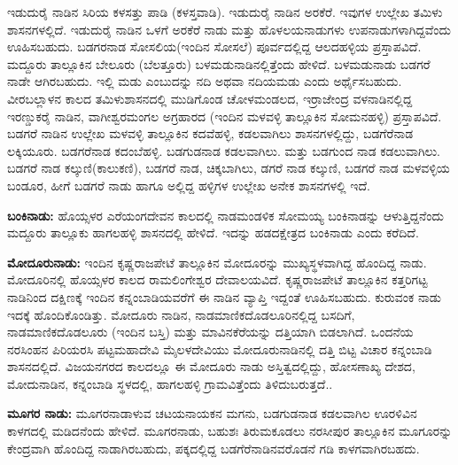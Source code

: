 ಇಡುದುರೈ ನಾಡಿನ ಸಿರಿಯ ಕಳಸತ್ತು ಪಾಡಿ (ಕಳಸ್ತವಾಡಿ). ಇಡುದುರೈ ನಾಡಿನ ಅರಕೆರೆ. ಇವುಗಳ ಉಲ್ಲೇಖ ತಮಿಳು ಶಾಸನಗಳಲ್ಲಿದೆ. ಇಡುದುರೈ ನಾಡಿನ ಒಳಗೆ ಅರಕೆರೆ ನಾಡು ಮತ್ತು ಹೊಳಲಯನಾಡುಗಳು ಉಪನಾಡುಗಳಾಗಿದ್ದವೆಂದು ಊಹಿಸಬಹುದು. ಬಡಗರನಾಡ ಸೋಸಲಿಯ(ಇಂದಿನ ಸೋಸಲೆ) ಪೂರ್ವದಲ್ಲಿದ್ದ ಆಲದಹಳ್ಳಿಯ ಪ್ರಸ್ತಾಪವಿದೆ. ಮದ್ದೂರು ತಾಲ್ಲೂಕಿನ ಬೇಲೂರು (ಬೆಲತ್ತೂರು) ಬಳಮಡುನಾಡಿನಲ್ಲಿತ್ತೆಂದು ಹೇಳಿದೆ. ಬಳಮಡುನಾಡು ಬಡಗರೆ ನಾಡೇ ಆಗಿರಬಹುದು. ಇಲ್ಲಿ ಮಡು ಎಂಬುದನ್ನು ನದಿ ಅಥವಾ ನದಿಯಮಡು ಎಂದು ಅರ್ಥೈಸಬಹುದು. ವೀರಬಲ್ಲಾಳನ ಕಾಲದ ತಮಿಳುಶಾಸನದಲ್ಲಿ ಮುಡಿಗೊಂಡ ಚೋಳಮಂಡಲದ, ಇರ್ರಾಜೇಂದ್ರ ವಳನಾಡಿನಲ್ಲಿದ್ದ ಇರಣ್ಡುಕರೈ ನಾಡಿನ, ವಾಗೀಶ್ವರಮಂಗಲ ಅಗ್ರಹಾರದ (ಇಂದಿನ ಮಳವಳ್ಳಿ ತಾಲ್ಲೂಕಿನ ಸೋಮನಹಳ್ಳಿ) ಪ್ರಸ್ತಾಪವಿದೆ. ಬಡಗರೆ ನಾಡಿನ ಉಲ್ಲೇಖ ಮಳವಳ್ಳಿ ತಾಲ್ಲೂಕಿನ ಕದವೆಹಳ್ಳಿ, ಕಡಲವಾಗಿಲು ಶಾಸನಗಳಲ್ಲಿದ್ದು, ಬಡಗೆರೆನಾಡ ಲಕ್ಕಿಯೂರು. ಬಡಗರೆನಾಡ ಕದಂಬೆಹಳ್ಳಿ. ಬಡಗುಡನಾಡ ಕಡಲವಾಗಿಲು. ಮತ್ತು ಬಡಗುಂದ ನಾಡ ಕಡಲುವಾಗಿಲು. ಬಡಗರೆ ನಾಡ ಕಲ್ಕುಣಿ(ಕಾಲುಕಣಿ), ಬಡಗರೆ ನಾಡ, ಚಿಕ್ಕಬಾಗಿಲು, ಡಗರೆ ನಾಡ ಕಲ್ಕುಣಿ, ಬಡಗರೆ ನಾಡ ಮಳವಳ್ಳಿಯ ಬಂಡೂರ, ಹೀಗೆ ಬಡಗರೆ ನಾಡು ಹಾಗೂ ಅಲ್ಲಿದ್ದ ಹಳ್ಳಿಗಳ ಉಲ್ಲೇಖ ಅನೇಕ ಶಾಸನಗಳಲ್ಲಿ ಇದೆ.

\textbf{ಬಂಕಿನಾಡು:} ಹೊಯ್ಸಳರ ಎರೆಯಂಗದೇವನ ಕಾಲದಲ್ಲಿ ನಾಡಮಂಡಳಿಕ ಸೋಮಯ್ಯ ಬಂಕಿನಾಡನ್ನು ಆಳುತ್ತಿದ್ದ\-ನೆಂದು ಮದ್ದೂರು ತಾಲ್ಲೂಕು ಹಾಗಲಹಳ್ಳಿ ಶಾಸನದಲ್ಲಿ ಹೇಳಿದೆ. ಇದನ್ನು ಹಡದಕ್ಷೇತ್ರದ ಬಂಕಿನಾಡು ಎಂದು ಕರೆದಿದೆ.

\textbf{ಮೋದೂರುನಾಡು:} ಇಂದಿನ ಕೃಷ್ಣರಾಜಪೇಟೆ ತಾಲ್ಲೂಕಿನ ಮೋದೂರನ್ನು ಮುಖ್ಯಸ್ಥಳವಾಗಿದ್ದ ಹೊಂದಿದ್ದ ನಾಡು. ಮೋದೂರಿನಲ್ಲಿ ಹೊಯ್ಸಳರ ಕಾಲದ ರಾಮಲಿಂಗೇಶ್ವರ ದೇವಾಲಯವಿದೆ. ಕೃಷ್ಣರಾಜಪೇಟೆ ತಾಲ್ಲೂಕಿನ ಕತ್ತರಿಗಟ್ಟ ನಾಡಿನಿಂದ ದಕ್ಷಿಣಕ್ಕೆ ಇಂದಿನ ಕನ್ನಂಬಾಡಿಯವರೆಗೆ ಈ ನಾಡಿನ ವ್ಯಾಪ್ತಿ ಇದ್ದಂತೆ ಊಹಿಸಬಹುದು. ಕುರುವಂಕ ನಾಡು ಇದಕ್ಕೆ ಹೊಂದಿಕೊಂಡಿತ್ತು. ಮೋದೂರು ನಾಡಿನ, ನಾಡಮಾಣಿಕದೊಡಲೂರಿನಲ್ಲಿದ್ದ ಬಸದಿಗೆ, ನಾಡಮಾಣಿಕದೊಡಲೂರು (ಇಂದಿನ ಬಸ್ತಿ) ಮತ್ತು ಮಾವಿನಕೆರೆಯನ್ನು ದತ್ತಿಯಾಗಿ ಬಿಡಲಾಗಿದೆ. ಒಂದನೆಯ ನರಸಿಂಹನ ಪಿರಿಯರಸಿ ಪಟ್ಟಮಹಾದೇವಿ ಮೈಲಳದೇವಿಯು ಮೋದೂರುನಾಡಿನಲ್ಲಿ ದತ್ತಿ ಬಿಟ್ಟ ವಿಚಾರ ಕನ್ನಂಬಾಡಿ ಶಾಸನದಲ್ಲಿದೆ. ವಿಜಯನಗರದ ಕಾಲದಲ್ಲೂ ಈ ಮೋದೂರು ನಾಡು ಅಸ್ತಿತ್ವದಲ್ಲಿದ್ದು, ಹೋಸಣಾಖ್ಯ ದೇಶದ, ಮೋದುನಾಡಿನ, ಕನ್ನಂಬಾಡಿ ಸ್ಥಳದಲ್ಲಿ, ಹಾಗಲಹಳ್ಳಿ ಗ್ರಾಮವಿತ್ತೆಂದು ತಿಳಿದುಬರುತ್ತದೆ..

\textbf{ಮೂಗರ ನಾಡು:} ಮೂಗರನಾಡಾಳುವ ಚಟಯನಾಯಕನ ಮಗನು, ಬಡಗುಡನಾಡ ಕಡಲವಾಗಿಲ ಊರಳಿವಿನ ಕಾಳಗದಲ್ಲಿ ಮಡಿದನೆಂದು ಹೇಳಿದೆ. ಮೂಗರನಾಡು, ಬಹುಶಃ ತಿರುಮಕೂಡಲು ನರಸೀಪುರ ತಾಲ್ಲೂಕಿನ ಮೂಗೂರನ್ನು ಕೇಂದ್ರವಾಗಿ ಹೊಂದಿದ್ದ ನಾಡಾಗಿರಬಹುದು, ಪಕ್ಕದಲ್ಲಿದ್ದ ಬಡಗೆರೆನಾಡಿನವರೊಡನೆ ಗಡಿ ಕಾಳಗವಾಗಿರಬಹದು.

